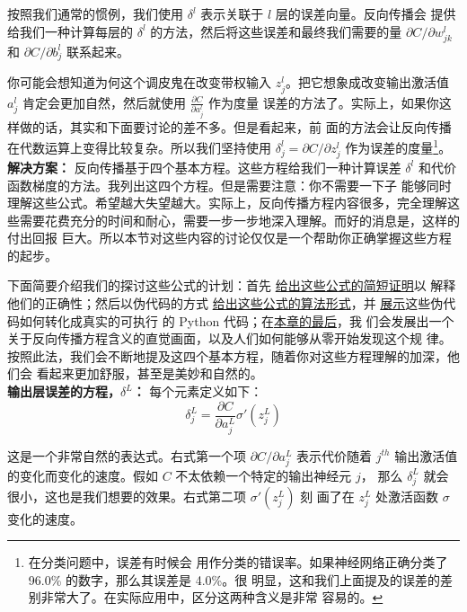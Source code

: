 按照我们通常的惯例，我们使用 $\delta^l$ 表示关联于 $l$ 层的误差向量。反向传播会
提供给我们一种计算每层的 $\delta^l$ 的方法，然后将这些误差和最终我们需要的量
$\partial C/\partial w_{jk}^l$ 和 $\partial C/\partial b_j^l$ 联系起来。

你可能会想知道为何这个调皮鬼在改变带权输入 $z_j^l$。把它想象成改变输出激活值
$a_j^l$ 肯定会更加自然，然后就使用 $\frac{\partial C}{\partial a_j^l}$ 作为度量
误差的方法了。实际上，如果你这样做的话，其实和下面要讨论的差不多。但是看起来，前
面的方法会让反向传播在代数运算上变得比较复杂。所以我们坚持使用 $\delta_j^l =
\partial C / \partial z_j^l$ 作为误差的度量\footnote{在分类问题中，误差有时候会
  用作分类的错误率。如果神经网络正确分类了 96.0\% 的数字，那么其误差是 4.0\%。很
  明显，这和我们上面提及的误差的差别非常大了。在实际应用中，区分这两种含义是非常
  容易的。}。\\

\textbf{解决方案：} 反向传播基于四个基本方程。这些方程给我们一种计算误差
$\delta^l$ 和代价函数梯度的方法。我列出这四个方程。但是需要注意：你不需要一下子
能够同时理解这些公式。希望越大失望越大。实际上，反向传播方程内容很多，完全理解这
些需要花费充分的时间和耐心，需要一步一步地深入理解。而好的消息是，这样的付出回报
巨大。所以本节对这些内容的讨论仅仅是一个帮助你正确掌握这些方程的起步。

下面简要介绍我们的探讨这些公式的计划：首先%
\hyperref[sec:proof_of_the_four_fundamental_equations]{给出这些公式的简短证明}以
解释他们的正确性；然后以伪代码的方式%
\hyperref[sec:the_backpropagation_algorithm]{给出这些公式的算法形式}，并%
\hyperref[sec:the_code_for_backpropagation]{展示}这些伪代码如何转化成真实的可执行
的 Python 代码；在\hyperref[sec:backpropagation_the_big_picture]{本章的最后}，我
们会发展出一个关于反向传播方程含义的直觉画面，以及人们如何能够从零开始发现这个规
律。按照此法，我们会不断地提及这四个基本方程，随着你对这些方程理解的加深，他们会
看起来更加舒服，甚至是美妙和自然的。\\

\textbf{输出层误差的方程，$\delta^L$：} 每个元素定义如下：
\begin{equation}
  \delta^L_j = \frac{\partial C}{\partial a^L_j} \sigma'(z^L_j)
  \label{eq:bp1}\tag{BP1}
\end{equation}

这是一个非常自然的表达式。右式第一个项 $\partial C/\partial a_j^L$ 表示代价随着
$j^{th}$ 输出激活值的变化而变化的速度。假如 $C$ 不太依赖一个特定的输出神经元 $j$，
那么 $\delta_j^L$ 就会很小，这也是我们想要的效果。右式第二项 $\sigma'(z_j^L)$ 刻
画了在 $z_j^L$ 处激活函数 $\sigma$ 变化的速度。

